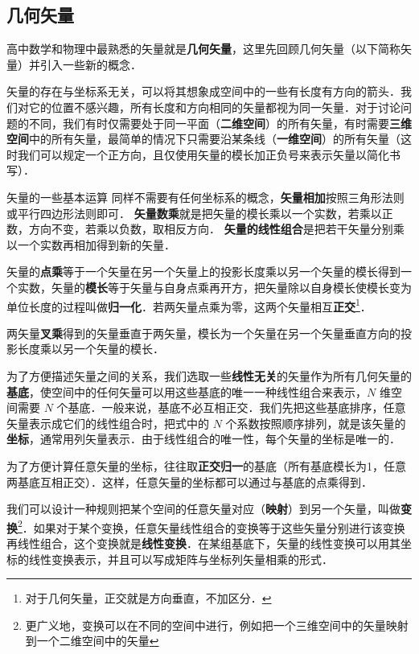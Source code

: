 
\subsection{几何矢量}
高中数学和物理中最熟悉的矢量就是\textbf{几何矢量}，这里先回顾几何矢量（以下简称矢量）并引入一些新的概念．

矢量的存在与坐标系无关，可以将其想象成空间中的一些有长度有方向的箭头．我们对它的位置不感兴趣，所有长度和方向相同的矢量都视为同一矢量．对于讨论问题的不同，我们有时仅需要处于同一平面（\textbf{二维空间}）的所有矢量，有时需要\textbf{三维空间}中的所有矢量，最简单的情况下只需要沿某条线（\textbf{一维空间}）的所有矢量（这时我们可以规定一个正方向，且仅使用矢量的模长加正负号来表示矢量以简化书写）．

矢量的一些基本运算 同样不需要有任何坐标系的概念，\textbf{矢量相加}按照三角形法则或平行四边形法则即可．
\textbf{矢量数乘}就是把矢量的模长乘以一个实数，若乘以正数，方向不变，若乘以负数，取相反方向． \textbf{矢量的线性组合}是把若干矢量分别乘以一个实数再相加得到新的矢量．

矢量的\textbf{点乘}等于一个矢量在另一个矢量上的投影长度乘以另一个矢量的模长得到一个实数，矢量的\textbf{模长}等于矢量与自身点乘再开方，把矢量除以自身模长使模长变为单位长度的过程叫做\textbf{归一化}．若两矢量点乘为零，这两个矢量相互\textbf{正交}\footnote{对于几何矢量，正交就是方向垂直，不加区分．}．

两矢量\textbf{叉乘}得到的矢量垂直于两矢量，模长为一个矢量在另一个矢量垂直方向的投影长度乘以另一个矢量的模长．

为了方便描述矢量之间的关系，我们选取一些\textbf{线性无关}的矢量作为所有几何矢量的\textbf{基底}，使空间中的任何矢量可以用这些基底的唯一一种线性组合来表示，$N$ 维空间需要 $N$ 个基底．一般来说，基底不必互相正交．我们先把这些基底排序，任意矢量表示成它们的线性组合时，把式中的 $N$ 个系数按照顺序排列，就是该矢量的\textbf{坐标}，通常用列矢量表示．由于线性组合的唯一性，每个矢量的坐标是唯一的．

为了方便计算任意矢量的坐标，往往取\textbf{正交归一}的基底（所有基底模长为1，任意两基底互相正交）．这样，任意矢量的坐标都可以通过与基底的点乘得到．

我们可以设计一种规则把某个空间的任意矢量对应（\textbf{映射}）到另一个矢量，叫做\textbf{变换}\footnote{更广义地，变换可以在不同的空间中进行，例如把一个三维空间中的矢量映射到一个二维空间中的矢量}．如果对于某个变换，任意矢量线性组合的变换等于这些矢量分别进行该变换再线性组合，这个变换就是\textbf{线性变换}．在某组基底下，矢量的线性变换可以用其坐标的线性变换表示，并且可以写成矩阵与坐标列矢量相乘的形式．%

